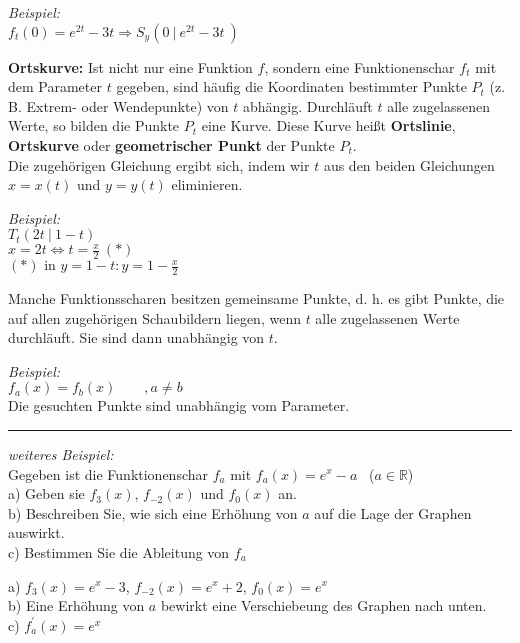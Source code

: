 \textit{Beispiel:}\\
$f_t(0) = e^{2t} -3t \Rightarrow S_y\left(0 \ | \ e^{2t} -3t \ \right)$
\begin{definition}
    \textbf{Ortskurve:} Ist nicht nur eine Funktion $f$, sondern eine Funktionenschar $f_t$ mit dem Parameter $t$ gegeben, sind häufig die Koordinaten bestimmter Punkte $P_t$ (z. B. Extrem- oder Wendepunkte) von $t$ abhängig. Durchläuft $t$ alle zugelassenen Werte, so bilden die Punkte $P_t$ eine Kurve. Diese Kurve heißt \textbf{Ortslinie}, \textbf{Ortskurve} oder \textbf{geometrischer Punkt} der Punkte $P_t$. \\
    Die zugehörigen Gleichung ergibt sich, indem wir $t$ aus den beiden Gleichungen $x = x(t)$ und $y = y(t)$ eliminieren.
\end{definition}
\textit{Beispiel:} \\
$T_t(2t \ | \ 1-t )$ \\
$x = 2t \Longleftrightarrow t = \frac{x}{2} \ (*)$\\
$(*) \text{ in } y = 1 - t: y = 1 - \frac{x}{2}$

Manche Funktionsscharen besitzen gemeinsame Punkte, d. h. es gibt Punkte, die auf allen zugehörigen Schaubildern liegen, wenn $t$ alle zugelassenen Werte durchläuft. Sie sind dann unabhängig von $t$. 

\textit{Beispiel:}\\
$f_a(x) = f_b(x) \qquad , a \neq b$\\
Die gesuchten Punkte sind unabhängig vom Parameter.

\noindent\rule{\textwidth}{1pt}

\textit{weiteres Beispiel:} \\
Gegeben ist die Funktionenschar $f_a$ mit $f_a(x) = e^x - a$ \ ($a \in \mathbb{R}$)\\
a) Geben sie $f_3(x)$, $f_{-2}(x)$ und $f_0(x)$ an.\\
b) Beschreiben Sie, wie sich eine Erhöhung von $a$ auf die Lage der Graphen auswirkt.\\
c) Bestimmen Sie die Ableitung von $f_a$

a) $f_3(x) = e^x -3$, $f_{-2}(x) = e^x +2$, $f_0(x) = e^x$ \\
b) Eine Erhöhung von $a$ bewirkt eine Verschiebeung des Graphen nach unten. \\
c) $f^\prime_a(x) = e^x$
\ \\
\ \\
\ \\
\ \\
\ \\
\ \\
\ \\
\ \\
